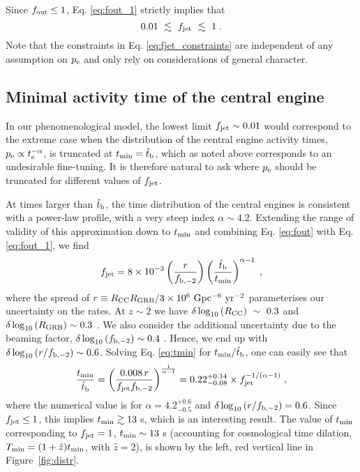 \documentclass[useAMS,usenatbib]{mn2e}
\begin{document}
Since $f_{\rm out}\leq 1$, Eq. \eqref{eq:fout_1} strictly implies that
\begin{equation}
\label{eq:fjet_constraints}
0.01~\lesssim~f_{\rm jet}~\lesssim~1\;.
\end{equation}
Note that the constraints in Eq. \eqref{eq:fjet_constraints} are independent of any assumption on $p_{\rm e}$ and only rely on considerations of general character.

\subsection{Minimal activity time of the central engine}

In our phenomenological model, the lowest limit $f_{\rm jet}\sim 0.01$ would correspond to the extreme case when the distribution of the central engine activity times, $p_{\rm e}\propto t_{\rm e}^{-\alpha}$, is truncated at $t_{\rm min}=\hat{t}_{\rm b}$, which as noted above corresponds to an undesirable fine-tuning. It is therefore natural to ask where $p_{\rm e}$ should be truncated for different values of $f_{\rm jet}$.

At times larger than $\hat{t}_{\rm b}$, the time distribution of the central engines is consistent with a power-law profile, with a very steep index $\alpha\sim 4.2$. Extending the range of validity of this approximation down to $t_{\rm min}$ and combining Eq. \eqref{eq:fout} with Eq. \eqref{eq:fout_1}, we find
\begin{equation}
\label{eq:tmin}
f_{\rm jet} = 8\times 10^{-3}\left(\frac{r}{f_{\rm b,-2}}\right) \left(\frac{\hat{t}_{\rm b}}{t_{\rm min}}\right)^{\alpha-1}\;,
\end{equation}
where the spread of $r\equiv R_{\rm CC}R_{\rm GRB}/3\times 10^6\text{ Gpc$^{-6}$ yr$^{-2}$}$ parameterises our uncertainty on the rates.
At $z\sim 2$ we have $\delta\log_{10}\left(R_{\rm CC}\right)~\sim~0.3$ \citep{Strolger2015} and $\delta\log_{10}\left(R_{\rm GRB}\right)\sim 0.3$ \citep{WandermanPiran2010}.
We also consider the additional uncertainty due to the beaming factor, $\delta\log_{10}\left(f_{\rm b,-2}\right)\sim 0.4$ \citep{Liang2008,Racusin2009,Goldstein2016}. Hence, we end up with $\delta\log_{10}\left(r/f_{\rm b,-2}\right)\sim 0.6$.
Solving Eq. \eqref{eq:tmin} for $t_{\rm min}/\hat{t}_{\rm b}$, one can easily see that
\begin{equation}
\label{eq:tmin2}
\frac{t_{\rm min}}{\hat{t}_{\rm b}} = \left(\frac{0.008\,r}{f_{\rm jet}f_{\rm b,-2}}\right)^{\frac{1}{\alpha-1}}
= 0.22_{-0.08}^{+0.14}\times f_{\rm jet}^{-1/(\alpha-1)}\;,
\end{equation}
where the numerical value is for $\alpha=4.2_{-0.5}^{+0.6}$ and $\delta\log_{10}\left(r/f_{\rm b,-2}\right)=0.6$. Since $f_{\rm jet}\leq1$, this implies $t_{\rm min}\gtrsim13\;$s, which is an interesting result. The value of $t_{\rm min}$ corresponding to $f_{\rm jet}=1$, $t_{\rm min}\sim 13\;$s (accounting for cosmological time dilation, $T_{\rm min}=(1+\hat{z})t_{\rm min}$, with $\hat{z}=2$), is shown by the left, red vertical line in Figure~\ref{fig:distr}.
\end{document}
